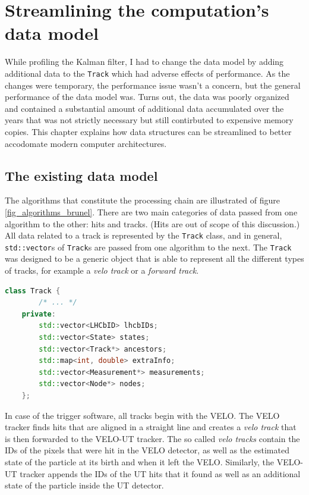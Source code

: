 \documentclass[12pt]{article}
\newcommand{\code}[1]{\texttt{#1}}
\begin{document}
\newpage
\section{Streamlining the computation's data model}

While profiling the Kalman filter, I had to change the data model by adding additional data to the \code{Track} which had adverse effects of performance. As the changes were temporary, the performance issue wasn't a concern, but the general performance of the data model was. Turns out, the data was poorly organized and contained a substantial amount of additional data accumulated over the years that was not strictly necessary but still contirbuted to expensive memory copies. This chapter explains how data structures can be streamlined to better accodomate modern computer architectures.

\subsection{The existing data model}

The algorithms that constitute the processing chain are illustrated of figure \ref{fig_algorithms_brunel}. There are two main categories of data passed from one algorithm to the other: hits and tracks. (Hits are out of scope of this discussion.) All data related to a track is represented by the \code{Track} class, and in general, \code{std::vector}s of \code{Track}s are passed from one algorithm to the next. The \code{Track} was designed to be a generic object that is able to represent all the different types of tracks, for example a \textit{velo track} or a \textit{forward track}.

\begin{lstlisting}[language=C++,caption=Simplified code of the \code{Track} class.,label=lst_trackv2_snippet]
	class Track {
		/* ... */
	private:
		std::vector<LHCbID> lhcbIDs;
		std::vector<State> states;
		std::vector<Track*> ancestors;
		std::map<int, double> extraInfo;
		std::vector<Measurement*> measurements;
		std::vector<Node*> nodes;
	};	
\end{lstlisting}

In case of the trigger software, all tracks begin with the VELO. The VELO tracker finds hits that are aligned in a straight line and creates a \textit{velo track} that is then forwarded to the VELO-UT tracker. The so called \textit{velo tracks} contain the IDs of the pixels that were hit in the VELO detector, as well as the estimated state of the particle at its birth and when it left the VELO. Similarly, the VELO-UT tracker appends the IDs of the UT hits that it found as well as an additional state of the particle inside the UT detector.
\end{document}
